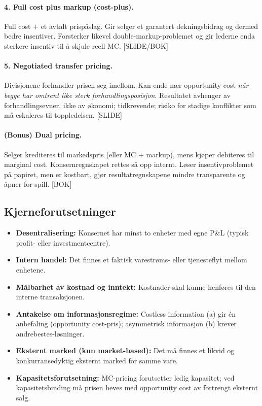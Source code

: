 \paragraph{4. Full cost plus markup (cost-plus).} Full cost $+$ et avtalt prispåslag. Gir selger et garantert dekningsbidrag og dermed bedre insentiver. Forsterker likevel double-markup-problemet og gir lederne enda sterkere insentiv til å skjule reell MC. [SLIDE/BOK]

\paragraph{5. Negotiated transfer pricing.} Divisjonene forhandler prisen seg imellom. Kan ende nær opportunity cost \emph{når begge har omtrent like sterk forhandlingsposisjon}. Resultatet avhenger av forhandlingsevner, ikke av økonomi; tidkrevende; risiko for stadige konflikter som må eskaleres til toppledelsen. [SLIDE]

\paragraph{(Bonus) Dual pricing.} Selger krediteres til markedspris (eller MC $+$ markup), mens kjøper debiteres til marginal cost. Konsernregnskapet rettes så opp internt. Løser insentivproblemet på papiret, men er kostbart, gjør resultatregnskapene mindre transparente og åpner for spill. [BOK]

\subsection*{Kjerneforutsetninger}
\begin{itemize}
\item \textbf{Desentralisering:} Konsernet har minst to enheter med egne P\&L (typisk profit- eller investmentcentre).
\item \textbf{Intern handel:} Det finnes et faktisk varestrøms- eller tjenesteflyt mellom enhetene.
\item \textbf{Målbarhet av kostnad og inntekt:} Kostnader skal kunne henføres til den interne transaksjonen.
\item \textbf{Antakelse om informasjonsregime:} Costless information (a) gir én anbefaling (opportunity cost-pris); asymmetrisk informasjon (b) krever andrebestes-løsninger.
\item \textbf{Eksternt marked (kun market-based):} Det må finnes et likvid og konkurransedyktig eksternt marked for samme vare.
\item \textbf{Kapasitetsforutsetning:} MC-pricing forutsetter ledig kapasitet; ved kapasitetsbinding må prisen heves med opportunity cost av fortrengt eksternt salg.
\end{itemize}

